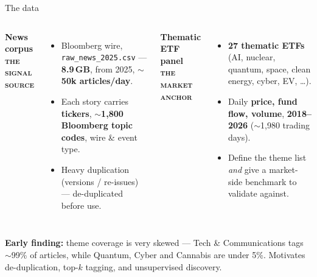 \documentclass[10pt,aspectratio=169]{beamer}
\newcommand{\panelheader}[3]{%
  \begin{tcolorbox}[
      enhanced, colback=#1, colframe=#1,
      boxrule=0pt, arc=2pt, left=10pt, right=10pt, top=6pt, bottom=6pt,
      sharp corners=southwest]
    {\color{white}\bfseries\large #2}\\[0.05cm]
    {\color{corporange}\scriptsize\bfseries\textsc{#3}}
  \end{tcolorbox}}
\begin{document}
\begin{frame}{The data}
  \footnotesize

  \begin{columns}[T,onlytextwidth]
      \panelheader{corpblue}{News corpus}{the signal source}
      \vspace{0.10cm}
      \begin{itemize}\setlength\itemsep{0.10cm}
        \item Bloomberg wire, \texttt{raw\_news\_2025.csv} ---
              \textbf{8.9\,GB}, from 2025, \textbf{$\sim$50k articles/day}.
        \item Each story carries \textbf{tickers},
              \textbf{$\sim$1{,}800 Bloomberg topic codes}, wire \& event type.
        \item Heavy duplication (versions / re-issues) ---
              de-duplicated before use.
      \end{itemize}

      \panelheader{corpgreen}{Thematic ETF panel}{the market anchor}
      \vspace{0.10cm}
      \begin{itemize}\setlength\itemsep{0.10cm}
        \item \textbf{27 thematic ETFs} (AI, nuclear, quantum, space,
              clean energy, cyber, EV, \dots).
        \item Daily \textbf{price, fund flow, volume},
              \textbf{2018--2026} ($\sim$1{,}980 trading days).
        \item Define the theme list \emph{and} give a market-side
              benchmark to validate against.
      \end{itemize}
  \end{columns}

  \vspace{0.20cm}
  \begin{tcolorbox}[colback=warn!12, colframe=warn,
                    boxrule=0.4pt, arc=2pt, left=8pt, right=8pt, top=4pt, bottom=4pt]
    \footnotesize
    \textbf{Early finding:} theme coverage is very skewed --- Tech \&
    Communications tags $\sim$99\% of articles, while Quantum, Cyber and
    Cannabis are under 5\%. Motivates de-duplication, top-$k$ tagging,
    and unsupervised discovery.
  \end{tcolorbox}

\end{frame}
\end{document}
